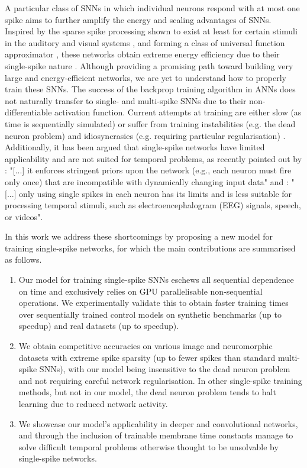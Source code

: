 \documentclass{article} \usepackage{iclr2023_conference,times}
\begin{document}
A particular class of SNNs in which individual neurons respond with at most one spike aims to further amplify the energy and scaling advantages of SNNs. Inspired by the sparse spike processing shown to exist at least for certain stimuli in the auditory and visual systems \citep{heil2004first, gollisch2008rapid}, and forming a class of universal function approximator \citep{comsa2020temporal}, these networks obtain extreme energy efficiency due to their single-spike nature \citep{oh2021spiking, liang20211}. Although providing a promising path toward building very large and energy-efficient networks, we are yet to understand how to properly train these SNNs. The success of the backprop training algorithm in ANNs does not naturally transfer to single- and multi-spike SNNs due to their non-differentiable activation function. Current attempts at training are either slow (as time is sequentially simulated) or suffer from training instabilities (e.g. the dead neuron problem) and idiosyncrasies (e.g. requiring particular regularisation) \citep{eshraghian2021training}. Additionally, it has been argued that single-spike networks have limited applicability and are not suited for temporal problems, as recently pointed out by \cite{eshraghian2021training}: "[...] it enforces stringent priors upon the network (e.g., each neuron must fire only once) that are incompatible with dynamically changing input data" and \cite{zenke2021visualizing}: "[...] only using single spikes in each neuron has its limits and is less suitable for processing temporal stimuli, such as electroencephalogram (EEG) signals, speech, or videos".
		
In this work we address these shortcomings by proposing a new model for training single-spike networks, for which the main contributions are summarised as follows.
\begin{enumerate}
	\item Our model for training single-spike SNNs eschews all sequential dependence on time and exclusively relies on GPU parallelisable non-sequential operations. We experimentally validate this to obtain faster training times over sequentially trained control models on synthetic benchmarks (up to  speedup) and real datasets (up to  speedup). 
	\item We obtain competitive accuracies on various image and neuromorphic datasets with extreme spike sparsity (up to  fewer spikes than standard multi-spike SNNs), with our model being insensitive to the dead neuron problem and not requiring careful network regularisation. In other single-spike training methods, but not in our model, the dead neuron problem tends to halt learning due to reduced network activity.
	\item We showcase our model's applicability in deeper and convolutional networks, and through the inclusion of trainable membrane time constants manage to solve difficult temporal problems otherwise thought to be unsolvable by single-spike networks.
\end{enumerate}
\end{document}
